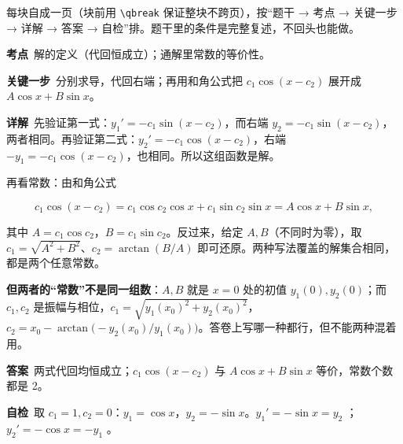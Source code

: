 \documentclass[11pt]{ctexart}
\renewcommand{\qbreak}{\needspace{0.26\textheight}}
\newcommand{\qpagebreak}{\needspace{0.92\textheight}}
\begin{document}
\flowerrule

\needspace{0.30\textheight}
\clearpage
{}


每块自成一页（块前用 \verb|\qbreak| 保证整块不跨页），按“题干 → 考点 → 关键一步 → 详解 → 答案 → 自检”排。题干里的条件是完整复述，不回头也能做。

\qpagebreak
{}
\label{c1:app:a1}

\qbreak
{}

\textbf{考点}\ 解的定义（代回恒成立）；通解里常数的等价性。

\textbf{关键一步}\ 分别求导，代回右端；再用和角公式把 $c_1\cos(x-c_2)$ 展开成 $A\cos x+B\sin x$。

\textbf{详解}\ 先验证第一式：$y_1'=-c_1\sin(x-c_2)$，而右端 $y_2=-c_1\sin(x-c_2)$，两者相同。再验证第二式：$y_2'=-c_1\cos(x-c_2)$，右端 $-y_1=-c_1\cos(x-c_2)$，也相同。所以这组函数是解。

再看常数：由和角公式

\[
c_1\cos(x-c_2)=c_1\cos c_2\cos x+c_1\sin c_2\sin x=A\cos x+B\sin x,
\]

其中 $A=c_1\cos c_2$，$B=c_1\sin c_2$。反过来，给定 $A,B$（不同时为零），取 $c_1=\sqrt{A^2+B^2}$、$c_2=\arctan(B/A)$ 即可还原。两种写法覆盖的解集合相同，都是两个任意常数。

\textbf{但两者的“常数”不是同一组数}：$A,B$ 就是 $x=0$ 处的初值 $y_1(0),y_2(0)$；而 $c_1,c_2$ 是振幅与相位，$c_1=\sqrt{y_1(x_0)^2+y_2(x_0)^2}$，$c_2=x_0-\arctan\bigl(-y_2(x_0)/y_1(x_0)\bigr)$。答卷上写哪一种都行，但不能两种混着用。

\textbf{答案}\ 两式代回均恒成立；$c_1\cos(x-c_2)$ 与 $A\cos x+B\sin x$ 等价，常数个数都是 2。

\textbf{自检}\ 取 $c_1=1,c_2=0$：$y_1=\cos x$，$y_2=-\sin x$。$y_1'=-\sin x=y_2$ ；$y_2'=-\cos x=-y_1$ 。

\qpagebreak
{}
\label{c1:app:a2}
\end{document}
